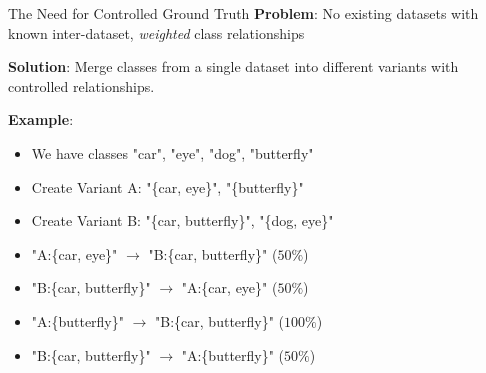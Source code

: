 \documentclass[aspectratio=169]{beamer}
\begin{document}
\begin{frame}{The Need for Controlled Ground Truth}
    \textbf{Problem}: No existing datasets with known inter-dataset, \textit{weighted} class relationships

    \vspace{1em}

    \textbf{Solution}: Merge classes from a single dataset into different variants with controlled relationships.

    \vspace{1em}

    \textbf{Example}:

    \begin{itemize}
        \item We have classes "car", "eye", "dog", "butterfly"
        \item Create Variant A: "\{car, eye\}", "\{butterfly\}"
        \item Create Variant B: "\{car, butterfly\}", "\{dog, eye\}"
        \item "A:\{car, eye\}" $\rightarrow$ "B:\{car, butterfly\}" ($50\%$)
        \item "B:\{car, butterfly\}" $\rightarrow$ "A:\{car, eye\}" ($50\%$)
        \item "A:\{butterfly\}" $\rightarrow$ "B:\{car, butterfly\}" ($100\%$)
        \item "B:\{car, butterfly\}" $\rightarrow$ "A:\{butterfly\}" ($50\%$)
    \end{itemize}
\end{frame}
\end{document}
